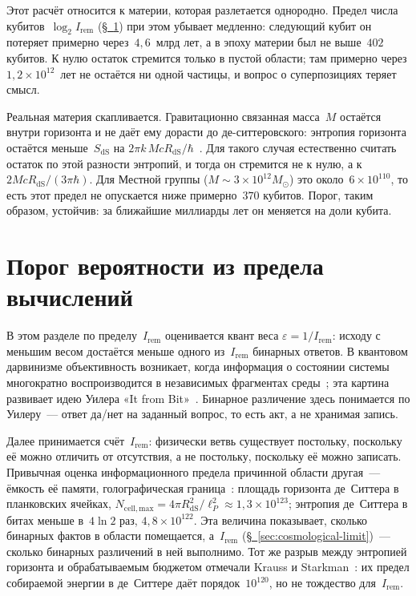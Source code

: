 \documentclass[11pt,a4paper]{article}
\newcommand{\Ost}{I_{\mathrm{rem}}}
\begin{document}
Этот расчёт относится к материи, которая разлетается однородно. Предел числа кубитов~$\log_2\Ost$ (\hyperref[sec:computational]{\S~\ref*{sec:computational}}) при этом убывает медленно: следующий кубит он потеряет примерно через~$4{,}6$~млрд лет, а в эпоху материи был не выше~$402$ кубитов. К нулю остаток стремится только в пустой области; там примерно через $1{,}2\times10^{12}$~лет не остаётся ни одной частицы, и вопрос о суперпозициях теряет смысл.

Реальная материя скапливается. Гравитационно связанная масса~$M$ остаётся внутри горизонта и не даёт ему дорасти до де-ситтеровского: энтропия горизонта остаётся меньше~$S_{\mathrm{dS}}$ на $2\pi k\,McR_{\mathrm{dS}}/\hbar$~\cite{bousso2002}. Для такого случая естественно считать остаток по этой разности энтропий, и тогда он стремится не к нулю, а к $2McR_{\mathrm{dS}}/(3\pi\hbar)$. Для Местной группы ($M\sim3\times10^{12}M_\odot$) это около~$6\times10^{110}$, то есть этот предел не опускается ниже примерно~$370$ кубитов. Порог, таким образом, устойчив: за ближайшие миллиарды лет он меняется на доли кубита.

\section{Порог вероятности из предела вычислений}
\label{sec:computational}

В этом разделе по пределу~$\Ost$ оценивается квант веса $\varepsilon=1/\Ost$: исходу с меньшим весом достаётся меньше одного из~$\Ost$ бинарных ответов. В квантовом дарвинизме объективность возникает, когда информация о состоянии системы многократно воспроизводится в независимых фрагментах среды~\cite{zurek2009}; эта картина развивает идею Уилера «It from Bit»~\cite{wheeler1989}. Бинарное различение здесь понимается по Уилеру~--- ответ да/нет на заданный вопрос, то есть акт, а не хранимая запись.

Далее принимается счёт~$\Ost$: физически ветвь существует постольку, поскольку её можно отличить от отсутствия, а не постольку, поскольку её можно записать. Привычная оценка информационного предела причинной области другая~--- ёмкость её памяти, голографическая граница~\cite{bousso2002}: площадь горизонта де~Ситтера в планковских ячейках, $N_{\mathrm{cell,max}}=4\pi R_{\mathrm{dS}}^2/\ell_P^2\approx1{,}3\times10^{123}$; энтропия де~Ситтера в битах меньше в~$4\ln2$ раз, $4{,}8\times10^{122}$. Эта величина показывает, сколько бинарных фактов в области помещается, а~$\Ost$ (\hyperref[sec:cosmological-limit]{\S~\ref*{sec:cosmological-limit}})~--- сколько бинарных различений в ней выполнимо. Тот же разрыв между энтропией горизонта и обрабатываемым бюджетом отмечали Krauss и Starkman~\cite{krauss2004}: их предел собираемой энергии в де~Ситтере даёт порядок~$10^{120}$, но не тождество для~$\Ost$.
\end{document}
